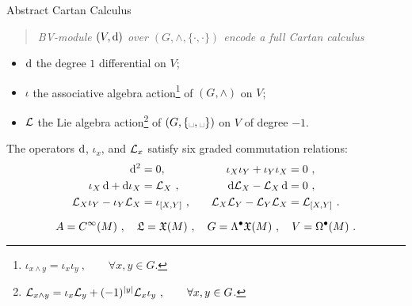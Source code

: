 \documentclass[beamer,10pt,handout]{standalone}  \Handouttrue
\begin{document}
\begin{frame}{Abstract Cartan Calculus}
  \begin{quote}
    \centering
    \emph{BV-module $(V,\mathop{}\!\mathrm{d})$ over $(G,\wedge,\lbrace\cdot,\cdot\rbrace)$ encode a full Cartan calculus}
  \end{quote}
  \vfill\pause
  \begin{denotblock}
    \begin{itemize}
      \item $\mathop{}\!\mathrm{d}$ the degree $1$ differential on $V$;
	    \item $\iota$ the associative algebra action\footnote{$\iota_{x\wedge y}=\iota_x\iota_y~, \qquad \forall x,y\in G$.} of $(G,\wedge)$ on $V$;
  	  \item $\mathcal{L}$ the Lie algebra action\footnote{$\mathcal{L}_{x\wedge y}=\iota_x\mathcal{L}_y + (-1)^{|y|}\mathcal{L}_x \iota_y~, \qquad \forall  x,y\in G$.} of $(G,\{\blank,\blank\})$ on $V$ of degree $-1$.
    \end{itemize}   
  \end{denotblock}
  \vfill\pause

  \begin{lemblock}
 The operators $\mathop{}\!\mathrm{d}$, $\iota_x$, and $\mathcal{L}_x$ satisfy six graded commutation relations:
  \begin{align*}
	  \mathop{}\!\mathrm{d}^2                            &= 0,            &&&
	\iota_X \iota_Y + \iota_Y \iota_X  &= 0 ~,         \\
\iota_X \mathop{}\!\mathrm{d}   +	\mathop{}\!\mathrm{d} \iota_X      &= \mathcal{L}_X ~,    &&&
	\mathop{}\!\mathrm{d} \mathcal{L}_X - \mathcal{L}_X \mathop{}\!\mathrm{d}          &= 0 ~,    \\
	\mathcal{L}_X \iota_Y - \iota_Y \mathcal{L}_X    &= \iota_{[X,Y]}~,  &&&
	\mathcal{L}_X \mathcal{L}_Y - \mathcal{L}_Y \mathcal{L}_X      &= \mathcal{L}_{[X,Y]}~. 
\end{align*}
  \end{lemblock}
  \vfill\pause

  \begin{exblock}
    \vspace{-0.5em}
    $$ A=C^\infty(M)~,  \quad \mathfrak{L}=\mathfrak{X}(M)~,\quad
     G=\Lambda^\bullet \mathfrak{X}(M)~, \quad V=\Omega^\bullet(M)~. $$
  \end{exblock}
\end{frame}
\end{document}
